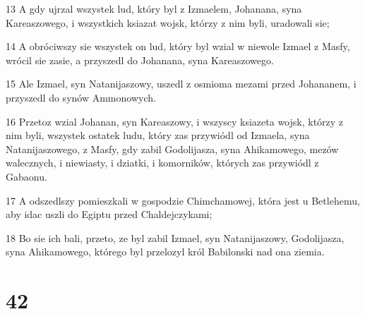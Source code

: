 \par 13 A gdy ujrzal wszystek lud, który byl z Izmaelem, Johanana, syna Kareaszowego, i wszystkich ksiazat wojsk, którzy z nim byli, uradowali sie;
\par 14 A obróciwszy sie wszystek on lud, który byl wzial w niewole Izmael z Masfy, wrócil sie zasie, a przyszedl do Johanana, syna Kareaszowego.
\par 15 Ale Izmael, syn Natanijaszowy, uszedl z osmioma mezami przed Johananem, i przyszedl do synów Ammonowych.
\par 16 Przetoz wzial Johanan, syn Kareaszowy, i wszyscy ksiazeta wojsk, którzy z nim byli, wszystek ostatek ludu, który zas przywiódl od Izmaela, syna Natanijaszowego, z Masfy, gdy zabil Godolijasza, syna Ahikamowego, mezów walecznych, i niewiasty, i dziatki, i komorników, których zas przywiódl z Gabaonu.
\par 17 A odszedlszy pomieszkali w gospodzie Chimchamowej, która jest u Betlehemu, aby idac uszli do Egiptu przed Chaldejczykami;
\par 18 Bo sie ich bali, przeto, ze byl zabil Izmael, syn Natanijaszowy, Godolijasza, syna Ahikamowego, którego byl przelozyl król Babilonski nad ona ziemia.

\chapter{42}

